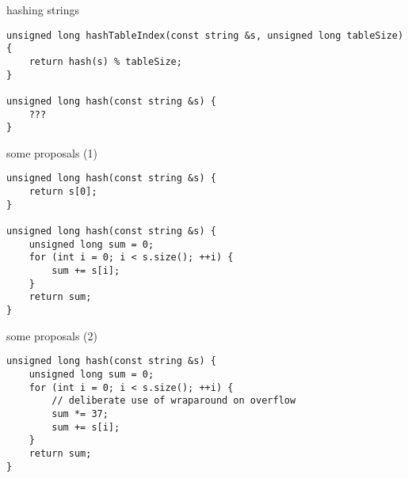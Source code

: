 \begin{frame}[fragile,label=hashStrIntro]{hashing strings}
\lstset{language=C++,style=small}
\begin{lstlisting}
unsigned long hashTableIndex(const string &s, unsigned long tableSize) {
    return hash(s) % tableSize;
}

unsigned long hash(const string &s) {
    ???
}
\end{lstlisting}
\end{frame}

\begin{frame}[fragile,label=hashStrProposals1]{some proposals (1)}
\lstset{language=C++,style=small}
\begin{lstlisting}
unsigned long hash(const string &s) {
    return s[0];
}

unsigned long hash(const string &s) {
    unsigned long sum = 0;
    for (int i = 0; i < s.size(); ++i) {
        sum += s[i];
    }
    return sum;
}
\end{lstlisting}
\end{frame}


\begin{frame}[fragile,label=hashStrProposals2]{some proposals (2)}
\lstset{language=C++,style=small}
\begin{lstlisting}
unsigned long hash(const string &s) {
    unsigned long sum = 0;
    for (int i = 0; i < s.size(); ++i) {
        // deliberate use of wraparound on overflow
        sum *= 37;
        sum += s[i];
    }
    return sum;
}
\end{lstlisting}
\end{frame}

